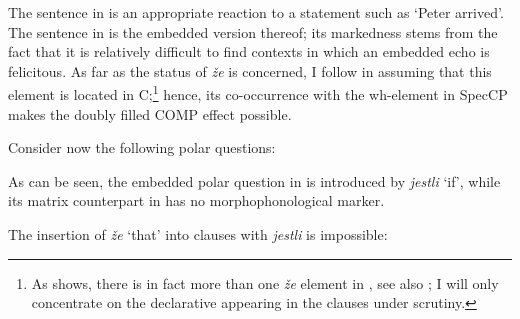 \documentclass[output=paper,modfonts, hidelinks, newtxmath]{langscibook}
\begin{document}
\ea
	\z
\z

\newpage 
\noindent The sentence in  is an appropriate reaction to a statement such as `Peter arrived'. The sentence in  is the embedded version thereof; its markedness stems from the fact that it is relatively difficult to find contexts in which an embedded echo is felicitous. As far as the status of \textit{že} is concerned, I follow \citet{kaspar2015} in assuming that this element is located in C;\footnote{As \citet{kaspar2015} shows, there is in fact more than one \textit{že} element in , see also \citet{gruetskrabalova2012}; I will only concentrate on the declarative  appearing in the clauses under scrutiny.} hence, its co-occurrence with the wh-element in SpecCP makes the doubly filled COMP effect possible.

Consider now the following polar questions:

\ea
	\z
\z

\noindent As can be seen, the embedded polar question in  is introduced by \textit{jestli} `if', while its matrix  counterpart in  has no morphophonological marker.

The insertion of \textit{že} `that' into clauses with \textit{jestli} is impossible:


\z 
\end{document}
